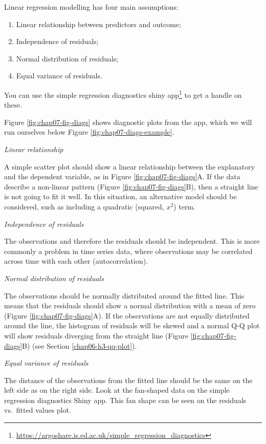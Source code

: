 \documentclass[
  12pt,
  krantz2]{krantz}
\providecommand{\tightlist}{%
  \setlength{\itemsep}{0pt}\setlength{\parskip}{0pt}}
\renewcommand{\href}[2]{#2\footnote{\url{#1}}}
\begin{document}
Linear regression modelling has four main assumptions:

\begin{enumerate}
\def\labelenumi{\arabic{enumi}.}
\tightlist
\item
  Linear relationship between predictors and outcome;
\item
  Independence of residuals;
\item
  Normal distribution of residuals;
\item
  Equal variance of residuals.
\end{enumerate}

You can use the \href{https://argoshare.is.ed.ac.uk/simple_regression_diagnostics}{simple regression diagnostics shiny app} to get a handle on these.

Figure \ref{fig:chap07-fig-diags} shows diagnostic plots from the app, which we will run ourselves below Figure \ref{fig:chap07-diags-example}.

\emph{Linear relationship}

A simple scatter plot should show a linear relationship between the explanatory and the dependent variable, as in Figure \ref{fig:chap07-fig-diags}A.
If the data describe a non-linear pattern (Figure \ref{fig:chap07-fig-diags}B), then a straight line is not going to fit it well.
In this situation, an alternative model should be considered, such as including a quadratic (squared, \(x^2\)) term.

\emph{Independence of residuals}

The observations and therefore the residuals should be independent.
This is more commonly a problem in time series data, where observations may be correlated across time with each other (autocorrelation).

\emph{Normal distribution of residuals}

The observations should be normally distributed around the fitted line.
This means that the residuals should show a normal distribution with a mean of zero (Figure \ref{fig:chap07-fig-diags}A).
If the observations are not equally distributed around the line, the histogram of residuals will be skewed and a normal Q-Q plot will show residuals diverging from the straight line (Figure \ref{fig:chap07-fig-diags}B) (see Section \ref{chap06-h3-qq-plot}).

\emph{Equal variance of residuals}

The distance of the observations from the fitted line should be the same on the left side as on the right side.
Look at the fan-shaped data on the simple regression diagnostics Shiny app.
This fan shape can be seen on the residuals vs.~fitted values plot.
\end{document}

